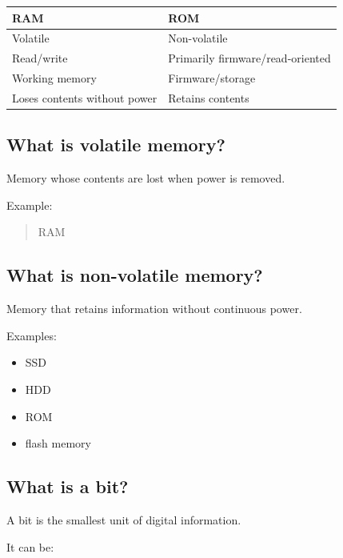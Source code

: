 \begin{center}
\setlength{\tabcolsep}{6pt}
\renewcommand{\arraystretch}{1.2}
\begin{tabular}{|l|l|}
\hline
\textbf{RAM} & \textbf{ROM} \\
\hline
Volatile & Non-volatile \\
Read/write & Primarily firmware/read-oriented \\
Working memory & Firmware/storage \\
Loses contents without power & Retains contents \\
\hline
\end{tabular}
\end{center}

\medskip

\subsection{What is volatile memory?}

Memory whose contents are lost when power is removed.

Example:

\begin{quote}
RAM\\
\end{quote}

\medskip

\subsection{What is non-volatile memory?}

Memory that retains information without continuous power.

Examples:

\begin{itemize}
  \item SSD
  \item HDD
  \item ROM
  \item flash memory
\end{itemize}

\medskip

\subsection{What is a bit?}

A bit is the smallest unit of digital information.

It can be:

